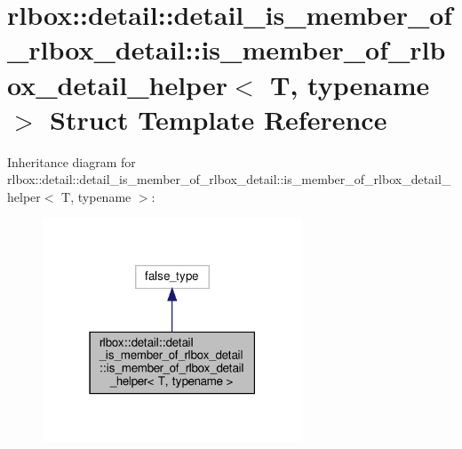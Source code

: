 \hypertarget{structrlbox_1_1detail_1_1detail__is__member__of__rlbox__detail_1_1is__member__of__rlbox__detail__helper}{}\section{rlbox\+:\+:detail\+:\+:detail\+\_\+is\+\_\+member\+\_\+of\+\_\+rlbox\+\_\+detail\+:\+:is\+\_\+member\+\_\+of\+\_\+rlbox\+\_\+detail\+\_\+helper$<$ T, typename $>$ Struct Template Reference}
\label{structrlbox_1_1detail_1_1detail__is__member__of__rlbox__detail_1_1is__member__of__rlbox__detail__helper}


Inheritance diagram for rlbox\+:\+:detail\+:\+:detail\+\_\+is\+\_\+member\+\_\+of\+\_\+rlbox\+\_\+detail\+:\+:is\+\_\+member\+\_\+of\+\_\+rlbox\+\_\+detail\+\_\+helper$<$ T, typename $>$\+:
\nopagebreak
\begin{figure}[H]
\begin{center}
\leavevmode
\includegraphics[width=219pt]{structrlbox_1_1detail_1_1detail__is__member__of__rlbox__detail_1_1is__member__of__rlbox__detail__helper__inherit__graph}
\end{center}
\end{figure}


